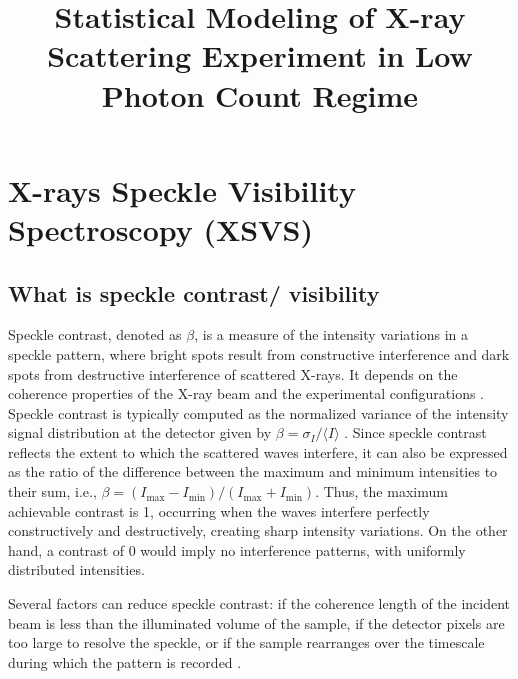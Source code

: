 \documentclass[11pt]{article}
\theoremstyle{definition}
\begin{document}


\title{\LARGE {\textbf{Statistical Modeling of X-ray Scattering Experiment in Low Photon Count Regime}}}
\maketitle
\newpage
\section{X-rays Speckle Visibility Spectroscopy (XSVS)}
\subsection{What is speckle contrast/ visibility}
\label{subsec:speckle}
Speckle contrast, denoted as $\beta$, is a measure of the intensity variations in a speckle pattern, where bright spots result from constructive interference and dark spots from destructive interference of scattered X-rays. It depends on the coherence properties of the X-ray beam and the experimental configurations \cite{hruszkewycz_high_2012}. Speckle contrast is typically computed as the normalized variance of the intensity signal distribution at the detector given by $\beta = \sigma_I/\langle I \rangle$ \cite{hruszkewycz_high_2012}. Since speckle contrast reflects the extent to which the scattered waves interfere, it can also be expressed as the ratio of the difference between the maximum and minimum intensities to their sum, i.e., \(\beta = (I_{\text{max}} - I_{\text{min}})/( I_{\text{max}} + I_{\text{min}})\). Thus, the maximum achievable contrast is 1, occurring when the waves interfere perfectly constructively and destructively, creating sharp intensity variations. On the other hand, a contrast of 0 would imply no interference patterns, with uniformly distributed intensities. 

Several factors can reduce speckle contrast: if the coherence length of the incident beam is less than the illuminated volume of the sample, if the detector pixels are too large to resolve the speckle, or if the sample rearranges over the timescale during which the pattern is recorded \cite{hruszkewycz_high_2012}. 
\end{document}
